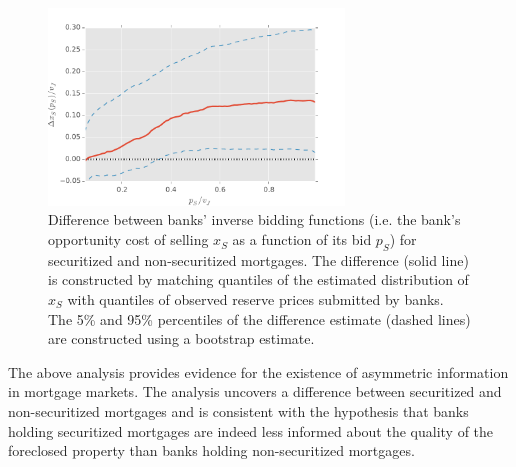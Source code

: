 \documentclass[11pt,twopage]{article}
\begin{document}
\begin{figure}[htp]
	\begin{center}
		\includegraphics[width=0.7\textwidth]{graphics/xs-diff-10-line}
		\caption{Difference between banks' inverse bidding functions (i.e. the bank's opportunity cost of selling $x_S$ as a function of its bid $p_S$) for securitized and non-securitized mortgages. The difference (solid line) is constructed by matching quantiles of the estimated distribution of $x_S$ with quantiles of observed reserve prices submitted by banks. The 5\% and 95\% percentiles of the difference estimate (dashed lines) are constructed using a bootstrap estimate.\label{fig:xs-diff-10}}
	\end{center}
\end{figure}

The above analysis provides evidence for the existence of asymmetric information in mortgage markets. The analysis uncovers a difference between securitized and non-securitized mortgages and is consistent with the hypothesis that banks holding securitized mortgages are indeed less informed about the quality of the foreclosed property than banks holding non-securitized mortgages.
\end{document}

